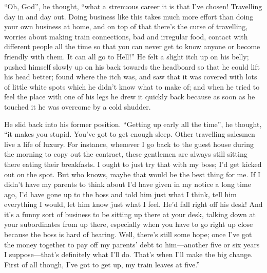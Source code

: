 “Oh, God”, he thought, “what a strenuous career it is that I’ve chosen!
Travelling day in and day out. Doing business like this takes much more
effort than doing your own business at home, and on top of that there’s
the curse of travelling, worries about making train connections, bad
and irregular food, contact with different people all the time so that
you can never get to know anyone or become friendly with them. It can
all go to Hell!” He felt a slight itch up on his belly; pushed himself
slowly up on his back towards the headboard so that he could lift his
head better; found where the itch was, and saw that it was covered with
lots of little white spots which he didn’t know what to make of; and
when he tried to feel the place with one of his legs he drew it quickly
back because as soon as he touched it he was overcome by a cold
shudder.

He slid back into his former position. “Getting up early all the time”,
he thought, “it makes you stupid. You’ve got to get enough sleep. Other
travelling salesmen live a life of luxury. For instance, whenever I go
back to the guest house during the morning to copy out the contract,
these gentlemen are always still sitting there eating their breakfasts.
I ought to just try that with my boss; I’d get kicked out on the spot.
But who knows, maybe that would be the best thing for me. If I didn’t
have my parents to think about I’d have given in my notice a long time
ago, I’d have gone up to the boss and told him just what I think, tell
him everything I would, let him know just what I feel. He’d fall right
off his desk! And it’s a funny sort of business to be sitting up there
at your desk, talking down at your subordinates from up there,
especially when you have to go right up close because the boss is hard
of hearing. Well, there’s still some hope; once I’ve got the money
together to pay off my parents’ debt to him—another five or six years I
suppose—that’s definitely what I’ll do. That’s when I’ll make the big
change. First of all though, I’ve got to get up, my train leaves at
five.”

